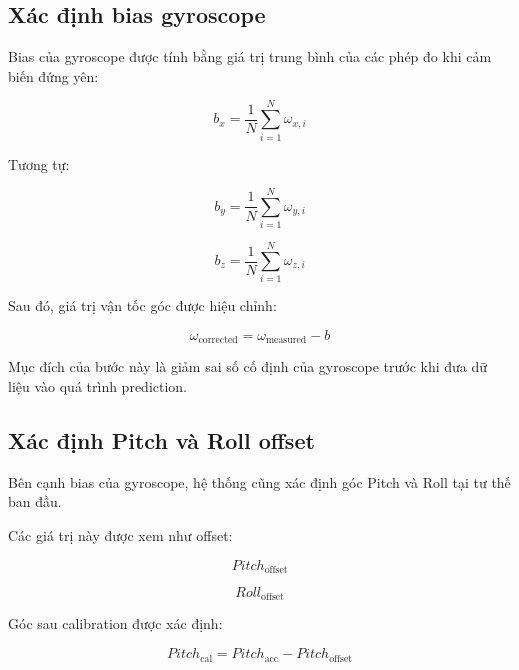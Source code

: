 \documentclass[a4paper,12pt]{report}
\begin{document}
\subsection{Xác định bias gyroscope}

Bias của gyroscope được tính bằng giá trị trung bình của các phép đo khi cảm biến đứng yên:

\begin{equation}
b_x=
\frac{1}{N}
\sum_{i=1}^{N}
\omega_{x,i}
\end{equation}

Tương tự:

\begin{equation}
b_y=
\frac{1}{N}
\sum_{i=1}^{N}
\omega_{y,i}
\end{equation}

\begin{equation}
b_z=
\frac{1}{N}
\sum_{i=1}^{N}
\omega_{z,i}
\end{equation}

Sau đó, giá trị vận tốc góc được hiệu chỉnh:

\begin{equation}
\omega_{\text{corrected}}
=
\omega_{\text{measured}}
-
b
\end{equation}

Mục đích của bước này là giảm sai số cố định của gyroscope trước khi đưa dữ liệu vào quá trình prediction.


\subsection{Xác định Pitch và Roll offset}

Bên cạnh bias của gyroscope, hệ thống cũng xác định góc Pitch và Roll tại tư thế ban đầu.

Các giá trị này được xem như offset:

\begin{equation}
Pitch_{\text{offset}}
\end{equation}

\begin{equation}
Roll_{\text{offset}}
\end{equation}

Góc sau calibration được xác định:

\begin{equation}
Pitch_{\text{cal}}
=
Pitch_{\text{acc}}
-
Pitch_{\text{offset}}
\end{equation}
\end{document}
